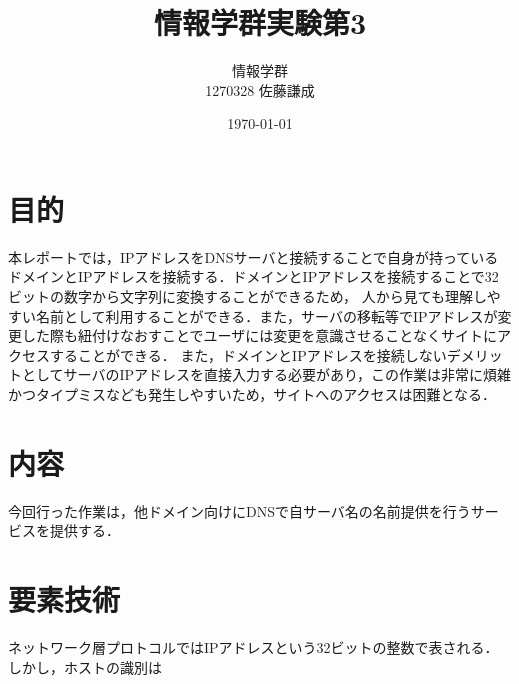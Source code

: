 \documentclass[divpdfmx]{jlreq}
\title{情報学群実験第3}
\author{情報学群 \\ 1270328 佐藤謙成}
\date{\today}
\begin{document}
\maketitle
\section{目的}
本レポートでは，IPアドレスをDNSサーバと接続することで自身が持っているドメインとIPアドレスを接続する．ドメインとIPアドレスを接続することで32ビットの数字から文字列に変換することができるため，
人から見ても理解しやすい名前として利用することができる．また，サーバの移転等でIPアドレスが変更した際も紐付けなおすことでユーザには変更を意識させることなくサイトにアクセスすることができる．
また，ドメインとIPアドレスを接続しないデメリットとしてサーバのIPアドレスを直接入力する必要があり，この作業は非常に煩雑かつタイプミスなども発生しやすいため，サイトへのアクセスは困難となる．
\section{内容}
今回行った作業は，他ドメイン向けにDNSで自サーバ名の名前提供を行うサービスを提供する．
\section{要素技術}
ネットワーク層プロトコルではIPアドレスという32ビットの整数で表される．しかし，ホストの識別は
\end{document}
